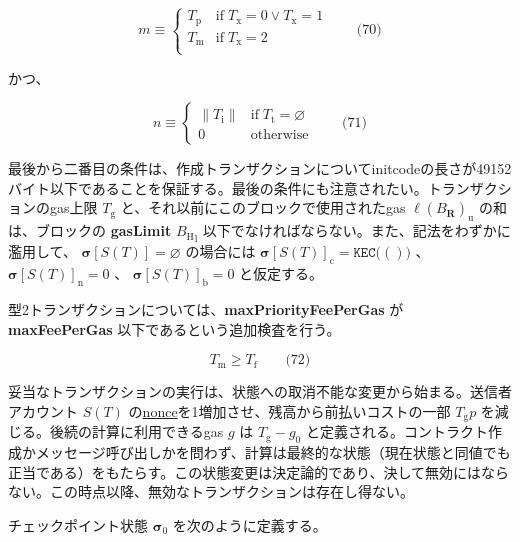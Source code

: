 \documentclass[
]{ltjsarticle}
\begin{document}
\protect\hypertarget{eq-70}{}{}

\[m \equiv \begin{cases}
  T_{\mathrm{p}} & \text{if} \; T_{\mathrm{x}} = 0 \lor T_{\mathrm{x}} = 1 \\
  T_{\mathrm{m}} & \text{if} \; T_{\mathrm{x}} = 2 \\
  \end{cases} \qquad \text{(70)}\]

かつ、

\protect\hypertarget{eq-71}{}{}

\[n \equiv \begin{cases}
    \lVert T_{\mathrm{i}} \rVert & \text{if} \; T_{\mathrm{t}} = \varnothing \\
    0 & \text{otherwise}
  \end{cases} \qquad \text{(71)}\]

最後から二番目の条件は、作成トランザクションについてinitcodeの長さが49152バイト以下であることを保証する。最後の条件にも注意されたい。トランザクションのgas上限
\(T_{\mathrm{g}}\) と、それ以前にこのブロックで使用されたgas
\(\ell(B_{\mathbf{R}})_{\mathrm{u}}\) の和は、ブロックの
\textbf{gasLimit} \({B_{\mathrm{H}}}_{\mathrm{l}}\)
以下でなければならない。また、記法をわずかに濫用して、
\(\boldsymbol{\sigma}[S(T)] = \varnothing\) の場合には
\(\boldsymbol{\sigma}[S(T)]_{\mathrm{c}} = \texttt{KEC}\big( () \big)\)
、 \(\boldsymbol{\sigma}[S(T)]_{\mathrm{n}} = 0\) 、
\(\boldsymbol{\sigma}[S(T)]_{\mathrm{b}} = 0\) と仮定する。

型2トランザクションについては、\textbf{maxPriorityFeePerGas} が
\textbf{maxFeePerGas} 以下であるという追加検査を行う。

\protect\hypertarget{eq-72}{}{}

\[T_{\mathrm{m}} \geqslant T_{\mathrm{f}} \qquad \text{(72)}\]

妥当なトランザクションの実行は、状態への取消不能な変更から始まる。送信者アカウント
\(S(T)\)
の\protect\hyperlink{account_nonce}{nonce}を1増加させ、残高から前払いコストの一部
\(T_{\mathrm{g}} p\) を減じる。後続の計算に利用できるgas \(g\) は
\(T_{\mathrm{g}} - g_0\)
と定義される。コントラクト作成かメッセージ呼び出しかを問わず、計算は最終的な状態（現在状態と同値でも正当である）をもたらす。この状態変更は決定論的であり、決して無効にはならない。この時点以降、無効なトランザクションは存在し得ない。

チェックポイント状態 \(\boldsymbol{\sigma}_0\) を次のように定義する。

\protect\hypertarget{eq-73}{}{}\protect\hypertarget{eq-74}{}{}\protect\hypertarget{eq-75}{}{}
\end{document}
